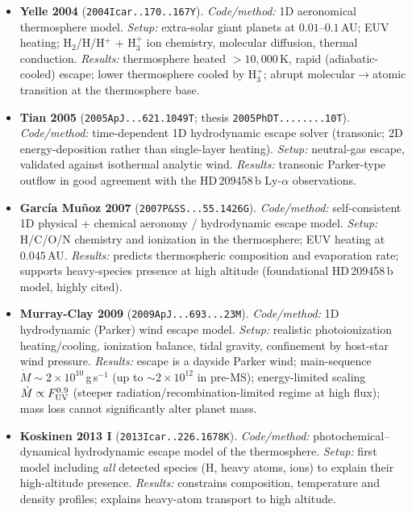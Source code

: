 \begin{itemize}

\item \textbf{Yelle 2004} (\texttt{2004Icar..170..167Y}).
\emph{Code/method:} 1D aeronomical thermosphere model.
\emph{Setup:} extra-solar giant planets at $0.01$--$0.1$\,AU; EUV heating; H$_2$/H/H$^+$ + H$_3^+$ ion chemistry, molecular diffusion, thermal conduction.
\emph{Results:} thermosphere heated $>10{,}000$\,K, rapid (adiabatic-cooled) escape; lower thermosphere cooled by H$_3^+$; abrupt molecular$\rightarrow$atomic transition at the thermosphere base.

\item \textbf{Tian 2005} (\texttt{2005ApJ...621.1049T}; thesis \texttt{2005PhDT........10T}).
\emph{Code/method:} time-dependent 1D hydrodynamic escape solver (transonic; 2D energy-deposition rather than single-layer heating).
\emph{Setup:} neutral-gas escape, validated against isothermal analytic wind.
\emph{Results:} transonic Parker-type outflow in good agreement with the HD\,209458\,b Ly-$\alpha$ observations.

\item \textbf{Garc\'ia Mu\~noz 2007} (\texttt{2007P\&SS...55.1426G}).
\emph{Code/method:} self-consistent 1D physical + chemical aeronomy / hydrodynamic escape model.
\emph{Setup:} H/C/O/N chemistry and ionization in the thermosphere; EUV heating at $0.045$\,AU.
\emph{Results:} predicts thermospheric composition and evaporation rate; supports heavy-species presence at high altitude (foundational HD\,209458\,b model, highly cited).

\item \textbf{Murray-Clay 2009} (\texttt{2009ApJ...693...23M}).
\emph{Code/method:} 1D hydrodynamic (Parker) wind escape model.
\emph{Setup:} realistic photoionization heating/cooling, ionization balance, tidal gravity, confinement by host-star wind pressure.
\emph{Results:} escape is a dayside Parker wind; main-sequence $\dot M\sim2\times10^{10}$\,g\,s$^{-1}$ (up to $\sim2\times10^{12}$ in pre-MS); energy-limited scaling $\dot M\propto F_{\rm UV}^{0.9}$ (steeper radiation/recombination-limited regime at high flux); mass loss cannot significantly alter planet mass.

\item \textbf{Koskinen 2013 I} (\texttt{2013Icar..226.1678K}).
\emph{Code/method:} photochemical--dynamical hydrodynamic escape model of the thermosphere.
\emph{Setup:} first model including \emph{all} detected species (H, heavy atoms, ions) to explain their high-altitude presence.
\emph{Results:} constrains composition, temperature and density profiles; explains heavy-atom transport to high altitude.


\end{itemize}
